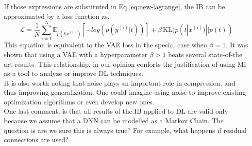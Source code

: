 \documentclass[twocolumn,superscriptaddress,aps]{revtex4-1}
\begin{document}
If those expressions are substituted in Eq.\ref{eq:new-lagrange}, the IB can be approximated by a loss function as,
$$
\mathcal{L} = \frac{1}{N} \sum_{i=1}^{N} \mathbb{E}_{p(t|x^{(i)})} \left[-log(p(y^{(i)}|t))\right] + \beta \, \text{KL}(p(t|x^{(i)}) || p(t))
$$
This equation is equivalent to the VAE loss in the special case when $\beta = 1$. It was shown that using a VAE with a hyperparameter $\beta > 1$ beats several state-of-the art results. This relationship, in our opinion conforts the justification of using MI as a tool to analyze or improve DL techniques. \\
\indent It is also worth noting that noise plays an important role in compression, and thus improving generalization. One could imagine using noise to improve existing optimization algorithms or even develop new ones.\\
\indent One last comment, is that all results of the IB applied to DL are valid only because we assume that a DNN can be modelled as a Markov Chain. The question is are we sure this is always true? For example, what happens if residual connections are used? 




\end{document}
